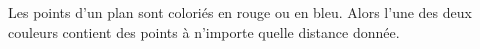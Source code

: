 Les points d'un plan sont coloriés en rouge ou en bleu. Alors l'une des deux couleurs contient des points à n'importe quelle distance donnée.
